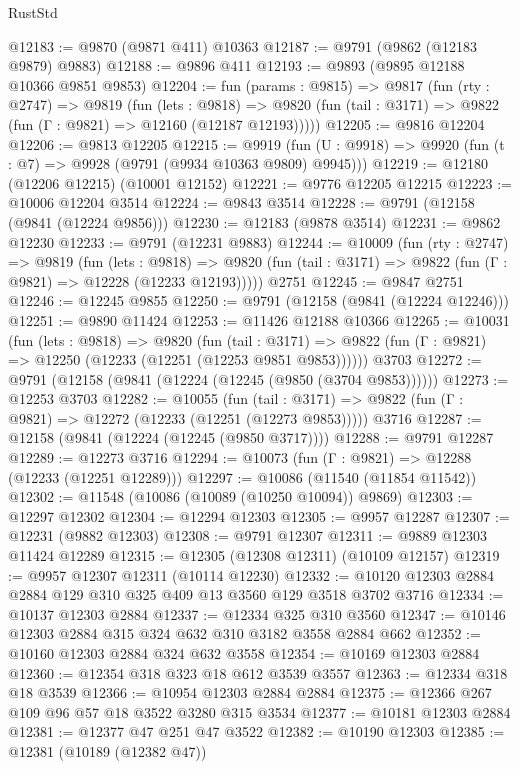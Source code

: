 \begin{lexlean}{RustStd}
\begin{coremodule}
@12183 := @9870 (@9871 @411) @10363
@12187 := @9791 (@9862 (@12183 @9879) @9883)
@12188 := @9896 @411
@12193 := @9893 (@9895 @12188 @10366 @9851 @9853)
@12204 := fun (params : @9815) =>
  @9817
    (fun (rty : @2747) =>
    @9819
      (fun (lets : @9818) =>
      @9820 (fun (tail : @3171) => @9822 (fun (Γ : @9821) => @12160 (@12187 @12193)))))
@12205 := @9816 @12204
@12206 := @9813 @12205
@12215 := @9919
    (fun (U : @9918) => @9920 (fun (t : @7) => @9928 (@9791 (@9934 @10363 @9809) @9945)))
@12219 := @12180 (@12206 @12215) (@10001 @12152)
@12221 := @9776 @12205 @12215
@12223 := @10006 @12204 @3514
@12224 := @9843 @3514
@12228 := @9791 (@12158 (@9841 (@12224 @9856)))
@12230 := @12183 (@9878 @3514)
@12231 := @9862 @12230
@12233 := @9791 (@12231 @9883)
@12244 := @10009
    (fun (rty : @2747) =>
    @9819
      (fun (lets : @9818) =>
      @9820 (fun (tail : @3171) => @9822 (fun (Γ : @9821) => @12228 (@12233 @12193)))))
    @2751
@12245 := @9847 @2751
@12246 := @12245 @9855
@12250 := @9791 (@12158 (@9841 (@12224 @12246)))
@12251 := @9890 @11424
@12253 := @11426 @12188 @10366
@12265 := @10031
    (fun (lets : @9818) =>
    @9820
      (fun (tail : @3171) =>
      @9822 (fun (Γ : @9821) => @12250 (@12233 (@12251 (@12253 @9851 @9853))))))
    @3703
@12272 := @9791 (@12158 (@9841 (@12224 (@12245 (@9850 (@3704 @9853))))))
@12273 := @12253 @3703
@12282 := @10055
    (fun (tail : @3171) => @9822 (fun (Γ : @9821) => @12272 (@12233 (@12251 (@12273 @9853)))))
    @3716
@12287 := @12158 (@9841 (@12224 (@12245 (@9850 @3717))))
@12288 := @9791 @12287
@12289 := @12273 @3716
@12294 := @10073 (fun (Γ : @9821) => @12288 (@12233 (@12251 @12289)))
@12297 := @10086 (@11540 (@11854 @11542))
@12302 := @11548 (@10086 (@10089 (@10250 @10094)) @9869)
@12303 := @12297 @12302
@12304 := @12294 @12303
@12305 := @9957 @12287
@12307 := @12231 (@9882 @12303)
@12308 := @9791 @12307
@12311 := @9889 @12303 @11424 @12289
@12315 := @12305 (@12308 @12311) (@10109 @12157)
@12319 := @9957 @12307 @12311 (@10114 @12230)
@12332 := @10120 @12303 @2884 @2884 @129 @310 @325 @409 @13 @3560 @129 @3518 @3702 @3716
@12334 := @10137 @12303 @2884
@12337 := @12334 @325 @310 @3560
@12347 := @10146 @12303 @2884 @315 @324 @632 @310 @3182 @3558 @2884 @662
@12352 := @10160 @12303 @2884 @324 @632 @3558
@12354 := @10169 @12303 @2884
@12360 := @12354 @318 @323 @18 @612 @3539 @3557
@12363 := @12334 @318 @18 @3539
@12366 := @10954 @12303 @2884 @2884
@12375 := @12366 @267 @109 @96 @57 @18 @3522 @3280 @315 @3534
@12377 := @10181 @12303 @2884
@12381 := @12377 @47 @251 @47 @3522
@12382 := @10190 @12303
@12385 := @12381 (@10189 (@12382 @47))

\end{coremodule}
\end{lexlean}
